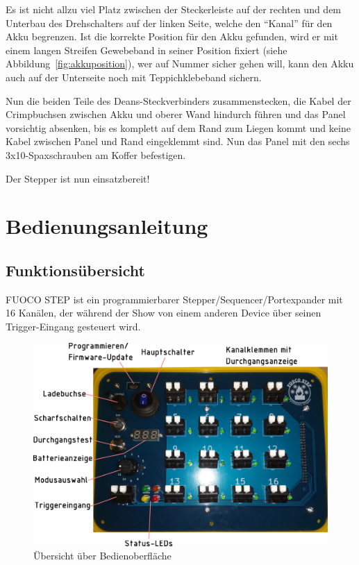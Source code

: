 \documentclass[paper=a4, open=any]{scrbook}
\begin{document}
			Es ist nicht allzu viel Platz zwischen der Steckerleiste auf der rechten und dem Unterbau des Drehschalters auf der linken Seite, welche den \enquote{Kanal} für den Akku begrenzen. Ist die korrekte Position für den Akku gefunden, wird er mit einem langen Streifen Gewebeband in seiner Position fixiert (siehe Abbildung~\ref{fig:akkuposition}), wer auf Nummer sicher gehen will, kann den Akku auch auf der Unterseite noch mit Teppichklebeband sichern.
			
			Nun die beiden Teile des Deans-Steckverbinders zusammenstecken, die Kabel der Crimpbuchsen zwischen Akku und oberer Wand hindurch führen und das Panel vorsichtig absenken, bis es komplett auf dem Rand zum Liegen kommt und keine Kabel zwischen Panel und Rand eingeklemmt sind. Nun das Panel mit den sechs 3x10-Spaxschrauben am Koffer befestigen.

			\begin{center}
				Der Stepper ist nun einsatzbereit!
			\end{center}
			\cleardoublepage\part{Bedienungsanleitung}

	\chapter{Funktionsübersicht}

		FUOCO STEP ist ein programmierbarer Stepper/Sequencer/Portexpander mit 16 Kanälen, der während der Show von einem anderen Device über seinen Trigger-Eingang gesteuert wird.

		\begin{figure}[!b]
			\centering\includegraphics[width=\textwidth]{oberflaeche}
			\caption{Übersicht über Bedienoberfläche}
			\label{fig:paneldescription}
		\end{figure}
\end{document}
